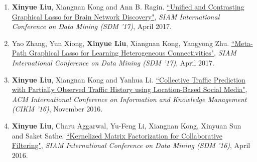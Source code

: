 \documentclass[a4paper,10pt]{article} %
\begin{document}
\begin{enumerate}[label=(C\arabic*).]
        \item \label{sdm17a} 
        \textbf{{Xinyue Liu}}, Xiangnan Kong and Ann B. Ragin. 
         \href{http://cinv.ro/files/SDM17.pdf}
         {``Unified and Contrasting Graphical Lasso for Brain Network Discovery"}, 
         \emph{SIAM International Conference on Data Mining (SDM '17)}, April 2017.
                             
        \item \label{sdm17b} 
        Yao Zhang, Yun Xiong, \textbf{{Xinyue Liu}}, Xiangnan Kong, Yangyong Zhu. 
         \href{http://cinv.ro/files/SDM17_Yao.pdf}
         {``Meta-Path Graphical Lasso for Learning Heterogeneous Connectivities"}, 
         \emph{SIAM International Conference on Data Mining (SDM '17)}, April 2017.
                             
        \item  \label{cikm16} 
        \textbf{{Xinyue Liu}}, Xiangnan Kong and Yanhua Li. 
         \href{http://cinv.ro/files/CIKM16.pdf}
         {``Collective Traffic Prediction with Partially Observed Traffic History using Location-Based Social Media"}, 
         \emph{ACM International Conference on Information and Knowledge Management (CIKM '16)}, November 2016.
                             
        \item  \label{sdm16}
        \textbf{{Xinyue Liu}}, Charu Aggarwal, Yu-Feng Li, Xiangnan Kong, Xinyuan Sun and Saket Sathe. 
         \href{http://cinv.ro/files/SDM16.pdf}
         {``Kernelized Matrix Factorization for Collaborative Filtering"}, 
         \emph{SIAM International Conference on Data Mining (SDM '16)}, April 2016.
    \end{enumerate}
    
\end{document}
